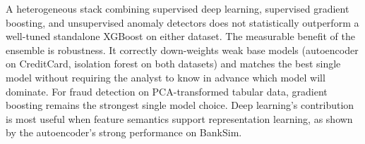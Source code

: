 \documentclass[11pt]{article}
\begin{document}
A heterogeneous stack combining supervised deep learning, supervised gradient boosting, and unsupervised anomaly detectors does not statistically outperform a well-tuned standalone XGBoost on either dataset. The measurable benefit of the ensemble is robustness. It correctly down-weights weak base models (autoencoder on CreditCard, isolation forest on both datasets) and matches the best single model without requiring the analyst to know in advance which model will dominate. For fraud detection on PCA-transformed tabular data, gradient boosting remains the strongest single model choice. Deep learning's contribution is most useful when feature semantics support representation learning, as shown by the autoencoder's strong performance on BankSim.



\end{document}
